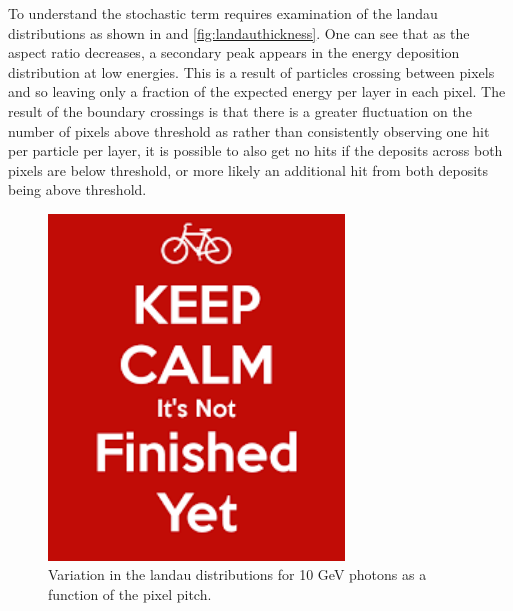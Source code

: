 To understand the stochastic term requires examination of the landau distributions as shown in  and \ref{fig:landauthickness}. One can see that as the aspect ratio decreases, a secondary peak appears in the energy deposition distribution at low energies. This is a result of particles crossing between pixels and so leaving only a fraction of the expected energy per layer in each pixel. The result of the boundary crossings is that there is a greater fluctuation on the number of pixels above threshold as rather than consistently observing one hit per particle per layer, it is possible to also get no hits if the deposits across both pixels are below threshold, or more likely an additional hit from both deposits being above threshold. 

\begin{figure}
  \centering
  \includegraphics[width=0.7\textwidth,keepaspectratio]{DECALStudies/fig/dummy}
  \caption{Variation in the landau distributions for 10 GeV photons as a function of the pixel pitch.}
  \label{fig:landaupitches}
\end{figure}

